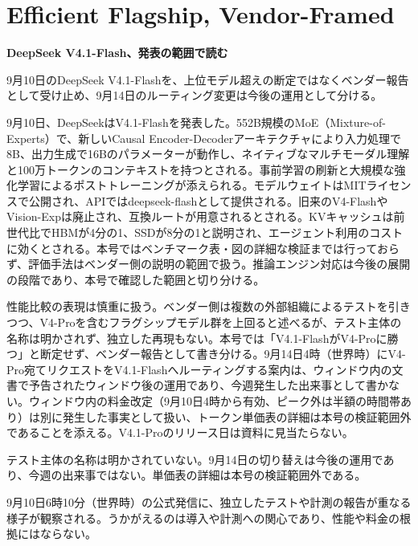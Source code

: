\section{Efficient Flagship, Vendor-Framed}
\begin{wideflow}
{\Large\bfseries DeepSeek V4.1-Flash、発表の範囲で読む}\par
\smallskip
{\color{SurveyMuted}9月10日のDeepSeek V4.1-Flashを、上位モデル超えの断定ではなくベンダー報告として受け止め、9月14日のルーティング変更は今後の運用として分ける。}\par
\end{wideflow}

9月10日、DeepSeekはV4.1-Flashを発表した\cite{deepseekflash}。552B規模のMoE（Mixture-of-Experts）で、新しいCausal Encoder-Decoderアーキテクチャにより入力処理で8B、出力生成で16Bのパラメーターが動作し、ネイティブなマルチモーダル理解と100万トークンのコンテキストを持つとされる。事前学習の刷新と大規模な強化学習によるポストトレーニングが添えられる。モデルウェイトはMITライセンスで公開され、APIではdeepseek-flashとして提供される。旧来のV4-FlashやVision-Expは廃止され、互換ルートが用意されるとされる。KVキャッシュは前世代比でHBMが4分の1、SSDが8分の1と説明され、エージェント利用のコストに効くとされる。本号ではベンチマーク表・図の詳細な検証までは行っておらず、評価手法はベンダー側の説明の範囲で扱う。推論エンジン対応は今後の展開の段階であり、本号で確認した範囲と切り分ける。

性能比較の表現は慎重に扱う。ベンダー側は複数の外部組織によるテストを引きつつ、V4-Proを含むフラグシップモデル群を上回ると述べるが、テスト主体の名称は明かされず、独立した再現もない\cite{deepseekflash}。本号では「V4.1-FlashがV4-Proに勝つ」と断定せず、ベンダー報告として書き分ける。9月14日4時（世界時）にV4-Pro宛てリクエストをV4.1-Flashへルーティングする案内は、ウィンドウ内の文書で予告されたウィンドウ後の運用であり\cite{deepseekapi}、今週発生した出来事として書かない。ウィンドウ内の料金改定（9月10日4時から有効、ピーク外は半額の時間帯あり）は別に発生した事実として扱い、トークン単価表の詳細は本号の検証範囲外であることを添える。V4.1-Proのリリース日は資料に見当たらない。

\begin{claimboundary}[比較と日付の境界]
テスト主体の名称は明かされていない。9月14日の切り替えは今後の運用であり、今週の出来事ではない。単価表の詳細は本号の検証範囲外である。
\end{claimboundary}

\begin{communitynote}
9月10日6時10分（世界時）の公式発信に、独立したテストや計測の報告が重なる様子が観察される\cite{w37x-deepseek-official,w37x-deepseek-ind}。うかがえるのは導入や計測への関心であり、性能や料金の根拠にはならない。
\end{communitynote}
